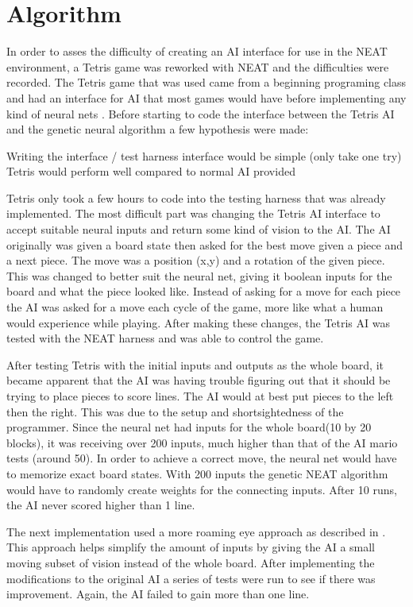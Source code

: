 \documentclass[12pt]{ucthesis} \newif\ifpdf \ifx\pdfoutput\undefined
\begin{document}
\chapter{Algorithm}

In order to asses the difficulty of creating an AI interface for use in the NEAT
environment, a Tetris game was reworked with NEAT and the difficulties were
recorded. The Tetris game that was used came from a beginning programing class
and had an interface for AI that most games would have before implementing any
kind of neural nets \cite{tetris}. Before starting to code the interface between
the Tetris AI and the genetic neural algorithm a few hypothesis were made:

Writing the interface / test harness interface would be simple (only take one
try) Tetris would perform well compared to normal AI provided

Tetris only took a few hours to code into the testing harness that was already
implemented. The most difficult part was changing the Tetris AI interface to
accept suitable neural inputs and return some kind of vision to the AI. The AI
originally was given a board state then asked for the best move given a piece
and a next piece. The move was a position (x,y) and a rotation of the given
piece. This was changed to better suit the neural net, giving it boolean inputs
for the board and what the piece looked like. Instead of asking for a move for
each piece the AI was asked for a move each cycle of the game, more like what a
human would experience while playing. After making these changes, the Tetris AI
was tested with the NEAT harness and was able to control the game.

After testing Tetris with the initial inputs and outputs as the whole board, it
became apparent that the AI was having trouble figuring out that it should be
trying to place pieces to score lines. The AI would at best put pieces to the
left then the right. This was due to the setup and shortsightedness of the
programmer. Since the neural net had inputs for the whole board(10 by 20
blocks), it was receiving over 200 inputs, much higher than that of the AI mario
tests (around 50). In order to achieve a correct move, the neural net would have
to memorize exact board states. With 200 inputs the genetic NEAT algorithm would
have to randomly create weights for the connecting inputs. After 10 runs, the AI
never scored higher than 1 line.

The next implementation used a more roaming eye approach as described in
\cite{stanley:phd04}. This approach helps simplify the amount of inputs by
giving the AI a small moving subset of vision instead of the whole board. After
implementing the modifications to the original AI a series of tests were run to
see if there was improvement. Again, the AI failed to gain more than one line.
\end{document}
